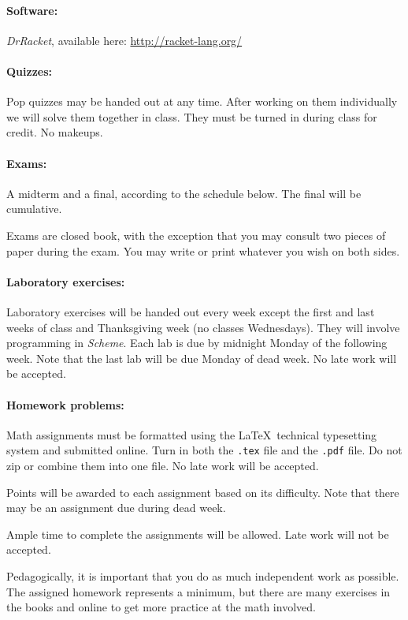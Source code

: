 \documentclass{article}
\begin{document}
\paragraph{Software:} {\em DrRacket}, available here: 
\url{http://racket-lang.org/}

\paragraph{Quizzes:}  
Pop quizzes may be handed out at any time.  After working
on them individually we will solve them together in class.
They must be turned in during class for credit.  No makeups.

\paragraph{Exams:} A midterm and a final, according to the schedule below.
The final will be cumulative.

Exams are closed book, with the exception that you may
consult two pieces of paper during the exam.  You may write or print
whatever you wish on both sides.

\paragraph{Laboratory exercises:}
Laboratory exercises will be handed out every week except the first
and last weeks of class and Thanksgiving week (no classes Wednesdays).
They will involve programming in {\em Scheme}.  Each lab is due by
midnight Monday of the following week.  Note that the last lab will be
due Monday of dead week.  No late work will be accepted.

\paragraph{Homework problems:}
Math assignments must be formatted using the \LaTeX\ technical
typesetting system and submitted online.  Turn in both the {\tt .tex}
file and the {\tt .pdf} file.  Do not zip or combine them into one
file.   No late work will be accepted.

Points will be awarded to each assignment based on its difficulty.
Note that there may be an assignment due during dead week.

Ample time to complete the assignments will be allowed.  Late work
will not be accepted.

Pedagogically, it is important that you do as much independent work as
possible.  The assigned homework represents a minimum, but there are
many exercises in the books and online to get more practice at the
math involved.
\end{document}
